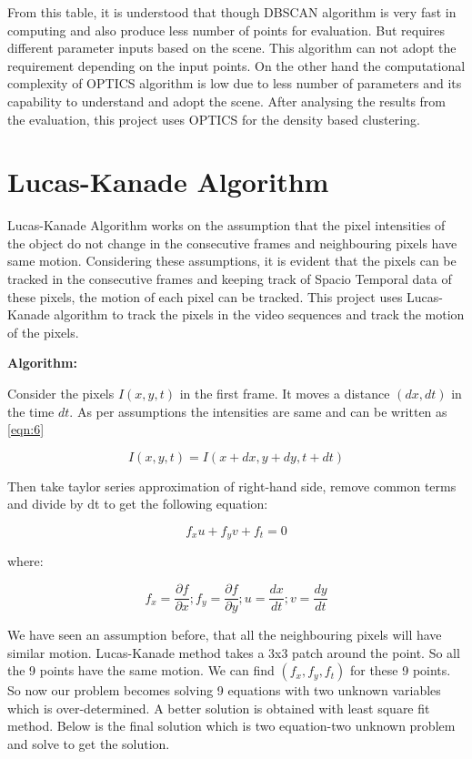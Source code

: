  From this table, it is understood that though DBSCAN algorithm is very fast in computing and also produce less number of points for evaluation. But requires different parameter inputs based on the scene. This algorithm can not adopt the requirement depending on the input points. On the other hand the computational complexity of OPTICS algorithm is low due to less number of parameters and its capability to understand and adopt the scene. After analysing the results from the evaluation, this project uses OPTICS for the density based clustering.
\section{Lucas-Kanade Algorithm}
Lucas-Kanade Algorithm works on the assumption that the pixel intensities of the object do not change in the consecutive frames and neighbouring pixels have same motion. Considering these assumptions, it is evident that the pixels can be tracked in the consecutive frames and keeping track of Spacio Temporal data of these pixels, the motion of each pixel can be tracked. This project uses Lucas-Kanade algorithm to track the pixels in the video sequences and track the motion of the pixels.

\textbf{Algorithm:}

Consider the pixels $I (x, y, t)$ in the first frame. It moves a distance $(dx, dt)$ in the time $dt$. As per assumptions the intensities are same and can be written as \ref{eqn:6}

\begin{equation}\label{eqn:6}
 I (x, y, t) = I (x+dx, y+dy, t+dt)   	
\end{equation}

Then take taylor series approximation of right-hand side, remove common terms and divide by dt to get the following equation:

\begin{equation}\label{eqn:7}
 f_{x} u + f_{y} v + f_{t} = 0
\end{equation}

where:

\begin{equation}
f_{x} =   \frac{\partial f}{\partial x} ; f_{y} =   \frac{\partial f}{\partial y} ; u = \frac{dx}{dt} ; v = \frac{dy}{dt}  
\end{equation}

We have seen an assumption before, that all the neighbouring pixels will have similar motion. Lucas-Kanade method takes a 3x3 patch around the point. So all the 9 points have the same motion. We can find $(f_{x}, f_{y}, f_{t})$ for these 9 points. So now our problem becomes solving 9 equations with two unknown variables which is over-determined. A better solution is obtained with least square fit method. Below is the final solution which is two equation-two unknown problem and solve to get the solution.

